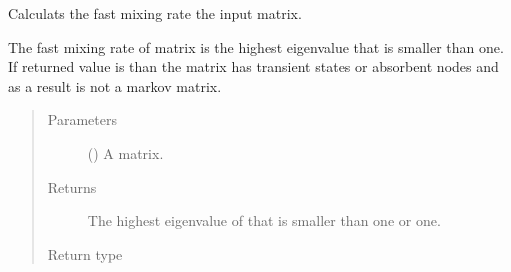 \documentclass[letterpaper,10pt,english]{sphinxmanual}
\begin{document}
\begin{fulllineitems}
\label{\detokenize{app.domain.helpers:app.domain.helpers.matrices.get_mixing_rate}}
Calculats the fast mixing rate the input matrix.

The fast mixing rate of matrix  is the highest eigenvalue that is
smaller than one. If returned value is  than the matrix has transient
states or absorbent nodes and as a result is not a markov matrix.
\begin{quote}\begin{description}
\item[{Parameters}] \leavevmode
{} () \textendash{} A matrix.

\item[{Returns}] \leavevmode
The highest eigenvalue of  that is smaller than one or one.

\item[{Return type}] \leavevmode
{}

\end{description}\end{quote}

\end{fulllineitems}

\end{document}
